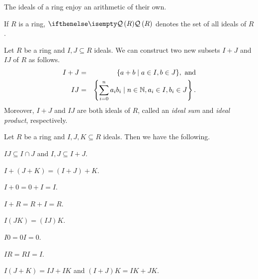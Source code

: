 The ideals of a ring enjoy an arithmetic of their own.

\begin{dfn}
If \(R\) is a ring, \(\IDEALS{R}\) denotes the set of all ideals of \(R\).
\end{dfn}

\begin{prop}
Let \(R\) be a ring and \(I, J \subseteq R\) ideals.
We can construct two new subsets \(I+J\) and \(IJ\) of \(R\) as follows.
\begin{eqnarray*}
I + J & = & \{ a+b \mid a \in I, b \in J \},\ \mathrm{and} \\
I   J & = & \left\{ \sum_{i=0}^n a_i b_i \mid n \in \mathbb{N}, a_i \in I, b_i \in J \right\}.
\end{eqnarray*}
Moreover, \(I+J\) and \(IJ\) are both ideals of \(R\), called an \emph{ideal sum} and \emph{ideal product}, respectively.
\end{prop}

\begin{prop}
Let \(R\) be a ring and \(I,J,K \subseteq R\) ideals.
Then we have the following.
\begin{proplist}
\item \(IJ \subseteq I \cap J\) and \(I,J \subseteq I+J\).
\item \(I+(J+K) = (I+J)+K\).
\item \(I+0 = 0+I = I\).
\item \(I+R = R+I = R\).
\item \(I(JK) = (IJ)K\).
\item \(I0 = 0I = 0\).
\item \(IR = RI = I\).
\item \(I(J+K) = IJ+IK\) and \((I+J)K = IK+JK\).
\end{proplist}
\end{prop}



\Exercises%

